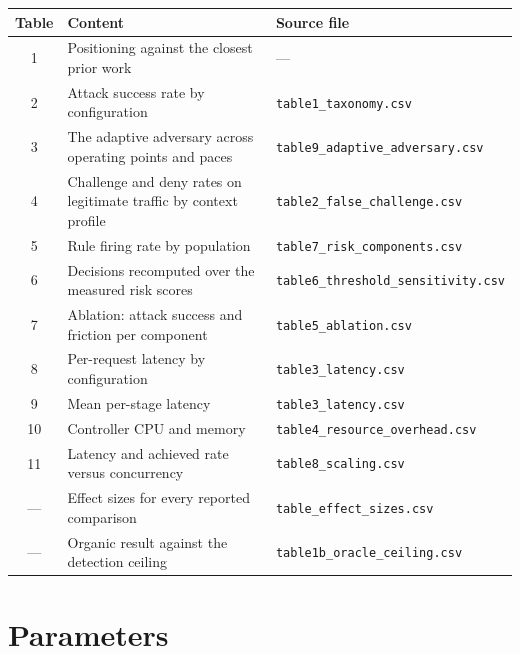 \begin{table}[h]
\centering
\small
\begin{tabular}{cp{4.3cm}p{2.3cm}}
\toprule
Table & Content & Source file \\
\midrule
1 & Positioning against the closest prior work & --- \\
2 & Attack success rate by configuration & \texttt{table1\_taxonomy.csv} \\
3 & The adaptive adversary across operating points and paces & \texttt{table9\_adaptive\_adversary.csv} \\
4 & Challenge and deny rates on legitimate traffic by context profile & \texttt{table2\_false\_challenge.csv} \\
5 & Rule firing rate by population & \texttt{table7\_risk\_components.csv} \\
6 & Decisions recomputed over the measured risk scores & \texttt{table6\_threshold\_sensitivity.csv} \\
7 & Ablation: attack success and friction per component & \texttt{table5\_ablation.csv} \\
8 & Per-request latency by configuration & \texttt{table3\_latency.csv} \\
9 & Mean per-stage latency & \texttt{table3\_latency.csv} \\
10 & Controller CPU and memory & \texttt{table4\_resource\_overhead.csv} \\
11 & Latency and achieved rate versus concurrency & \texttt{table8\_scaling.csv} \\
--- & Effect sizes for every reported comparison & \texttt{table\_effect\_sizes.csv} \\
--- & Organic result against the detection ceiling & \texttt{table1b\_oracle\_ceiling.csv} \\
\bottomrule
\end{tabular}
\end{table}

\appendix

\section{Parameters}
\label{app:a}

